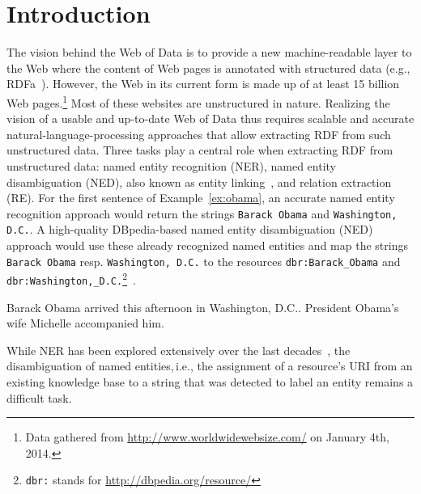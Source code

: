 \documentclass{llncs}
\begin{document}
\section{Introduction}
The vision behind the Web of Data is to provide a new machine-readable layer to the Web where the content of Web pages is annotated with structured data (e.g., RDFa~\cite{RDFa}).
However, the Web in its current form is made up of at least 15 billion Web pages.\footnote{Data gathered from \url{http://www.worldwidewebsize.com/} on January 4th, 2014.}
Most of these websites are unstructured in nature.
Realizing the vision of a usable and up-to-date Web of Data thus requires scalable and accurate natural-language-processing approaches that allow extracting RDF from such unstructured data.
Three tasks play a central role when extracting RDF from unstructured data: named entity recognition (NER), named entity disambiguation (NED), also known as entity linking~\cite{Mihalcea:2007:WLD:1321440.1321475}, and relation extraction (RE).
For the first sentence of Example~\ref{ex:obama}, an accurate named entity recognition approach would return the strings \texttt{Barack Obama} and \texttt{Washington, D.C.}.
A high-quality DBpedia-based named entity disambiguation (NED) approach would use these already recognized named entities and map the strings \texttt{Barack Obama} resp. \texttt{Washington, D.C.} to the resources \texttt{dbr:Barack\_Obama} and \texttt{dbr:Washington,\_D.C.}\footnote{\texttt{dbr:} stands for \url{http://dbpedia.org/resource/}}~\cite{dbpedia-swj}.
\begin{ex}
Barack Obama arrived this afternoon in Washington, D.C.. President Obama's wife Michelle accompanied him.
\label{ex:obama}
\end{ex}
While NER has been explored extensively over the last decades~\cite{StanfordNER}, the disambiguation of named entities,\,i.e., the assignment of a resource's URI from an existing knowledge base to a string that was detected to label an entity remains a difficult task.
\end{document}
